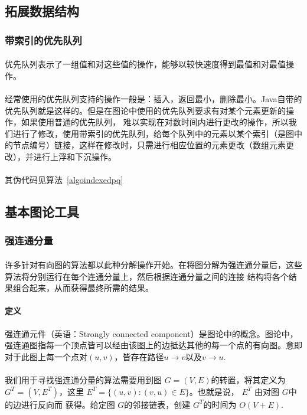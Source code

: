\documentclass[UTF8,a4paper]{ctexart}
\begin{document}
\subsection{拓展数据结构}
\subsubsection{带索引的优先队列~\cite{algs4}}\label{sec:indexedpq}
\paragraph{}优先队列表示了一组值和对这些值的操作，能够以较快速度得到最值和对最值操作。
\paragraph{}经常使用的优先队列支持的操作一般是：插入，返回最小，删除最小。Java自带的优先队列就是这样的。但是在图论中使用的优先队列要求有对某个元素更新的操作，如果使用普通的优先队列， 难以实现在对数时间内进行更改的操作，所以我们进行了修改，使用带索引的优先队列，给每个队列中的元素以某个索引（是图中的节点编号）链接，这样在修改时，只需进行相应位置的元素更改（数组元素更改），并进行上浮和下沉操作。
\paragraph{}其伪代码见算法~\ref{algoindexedpq}

\subsection{基本图论工具}
\subsubsection{强连通分量}\label{sec:scc}
\paragraph{}许多针对有向图的算法都以此种分解操作开始。在将图分解为强连通分量后，这些算法将分别运行在每个连通分量上，然后根据连通分量之间的连接 结构将各个结果组合起来，从而获得最终所需的结果。
\paragraph{定义}强连通元件（英语：Strongly connected component）是图论中的概念。图论中，强连通图指每一个顶点皆可以经由该图上的边抵达其他的每一个点的有向图。意即对于此图上每一个点对$(u,v)$，皆存在路径$u\to v$以及$v\to u$.
\paragraph{}我们用于寻找强连通分量的算法需要用到图 $G=(V, E)$的转置，将其定义为 $G^T=(V,E^T)$，这里 $E^T=\{(u, v): (v, u) \in E\}$。也就是说， $E^T$ 由对图 $G$中的边进行反向而 获得。给定图 $G$的邻接链表，创建 $G^T$的时间为 $O(V+E)$.
\end{document}
